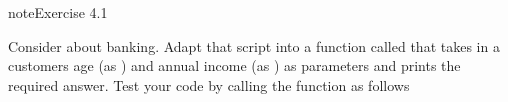 \documentclass[letterpaper,10pt,english]{jupyterBook}
\begin{document}
\begin{sphinxadmonition}{note}{Exercise 4.1}

\sphinxAtStartPar
Consider  about banking. Adapt that script into a function called  that takes in a customers age (as ) and annual income (as ) as parameters and prints the required answer. Test your code by calling the function as follows

\begin{sphinxVerbatim}[commandchars=\\\{\}]
    

 
 
 
     
\end{sphinxVerbatim}
\end{sphinxadmonition}
\end{document}
